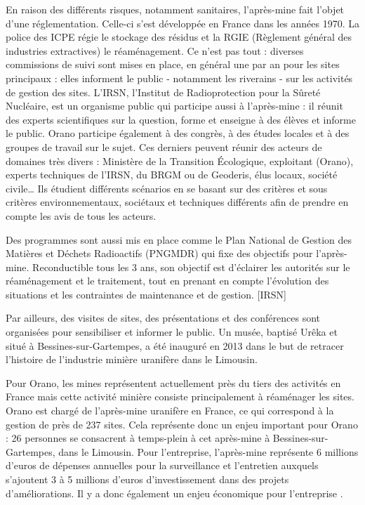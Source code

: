 \documentclass{article}
\begin{document}
En raison des différents risques, notamment sanitaires, l’après-mine fait l’objet d’une réglementation. Celle-ci s’est développée en France dans les années 1970.
 La police des ICPE régie le stockage des résidus et la RGIE (Règlement général des industries extractives) le réaménagement. Ce n’est pas tout : diverses commissions de suivi sont mises en place, en général une par an pour les sites principaux : elles informent le public - notamment les riverains - sur les activités de gestion des sites.
L’IRSN, l’Institut de Radioprotection pour la Sûreté Nucléaire, est un organisme public qui participe aussi à l’après-mine : il réunit des experts scientifiques sur la question, forme et enseigne à des élèves et informe le public. Orano participe également à des congrès, à des études locales et à des groupes de travail sur le sujet. Ces derniers peuvent réunir des acteurs de domaines très divers : Ministère de la Transition Écologique, exploitant (Orano), experts techniques de l’IRSN, du BRGM ou de Geoderis, élus locaux, société civile… Ils étudient différents scénarios en se basant sur des critères et sous critères environnementaux, sociétaux et techniques différents afin de prendre en compte les avis de tous les acteurs.

Des programmes sont aussi mis en place comme le Plan National de Gestion des Matières et Déchets Radioactifs (PNGMDR) qui fixe des objectifs pour l’après-mine. Reconductible tous les 3 ans, son objectif est d’éclairer les autorités sur le réaménagement et le traitement, tout en prenant en compte l’évolution des situations et les contraintes de maintenance et de gestion.  [IRSN]

Par ailleurs, des visites de sites, des présentations et des conférences sont organisées pour sensibiliser et informer le public. Un musée, baptisé Urêka et situé à Bessines-sur-Gartempes, a été inauguré en 2013 dans le but de retracer l’histoire de l’industrie minière uranifère dans le Limousin.

Pour Orano, les mines représentent actuellement près du tiers des activités en France mais cette activité minière consiste principalement à réaménager les sites. Orano est chargé de l’après-mine uranifère en France, ce qui correspond à la gestion de près de 237 sites. Cela représente donc un enjeu important pour Orano : 26 personnes se consacrent à temps-plein à cet après-mine à Bessines-sur-Gartempes, dans le Limousin. Pour l’entreprise, l’après-mine représente 6 millions d’euros de dépenses annuelles pour la surveillance et l’entretien auxquels s’ajoutent 3 à 5 millions d’euros d’investissement dans des projets d’améliorations. Il y a donc également un enjeu économique pour l’entreprise \cite{himeur_apres-mine_2020}. 
\end{document}
